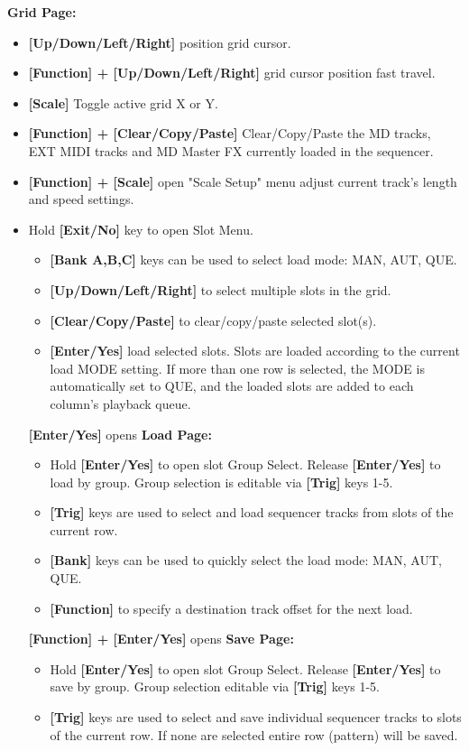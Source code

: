 \textbf{Grid Page:}
    \begin{itemize}
      \item \textbf{[Up/Down/Left/Right]} position grid cursor. 
      \item \textbf{[Function] + [Up/Down/Left/Right]} grid cursor position fast travel.
      \item \textbf{[Scale]} Toggle active grid X or Y. 
      \item \textbf{[Function] + [Clear/Copy/Paste]} Clear/Copy/Paste  the MD tracks, EXT MIDI tracks and MD Master FX currently loaded in the sequencer.
      \item \textbf{[Function] + [Scale]} open "Scale Setup" menu adjust current track's length and speed settings.
      \item Hold \textbf{[Exit/No]} key to open Slot Menu.
      \begin{itemize}
                \item \textbf{[Bank A,B,C]} keys can be used to select load mode: MAN, AUT, QUE.
                \item \textbf{[Up/Down/Left/Right]} to select multiple slots in the grid.
                \item \textbf{[Clear/Copy/Paste]} to clear/copy/paste selected slot(s).
                \item \textbf{[Enter/Yes]} load selected slots. Slots are loaded according to the current load MODE setting. If more than one row is selected, the MODE is automatically set to QUE, and the loaded slots are added to each column's playback queue.                
      \end{itemize}

\textbf{[Enter/Yes]} opens \textbf{Load Page:}
    \begin{itemize}
    \item Hold \textbf{[Enter/Yes]} to open slot Group Select. Release \textbf{[Enter/Yes]} to load by group. Group selection is editable via \textbf{[Trig]} keys 1-5.
    \item \textbf{[Trig]} keys are used to select and load sequencer tracks from slots of the current row.
    \item \textbf{[Bank]} keys can be used to quickly select the load mode: MAN, AUT, QUE.
    \item \textbf{[Function]} to specify a destination track offset for the next load.
    \end{itemize}
    
\textbf{[Function] + [Enter/Yes]} opens \textbf{Save Page:}
    \begin{itemize}
    \item Hold \textbf{[Enter/Yes]} to open slot Group Select. Release \textbf{[Enter/Yes]} to save by group.  Group selection editable via \textbf{[Trig]} keys 1-5.
    \item \textbf{[Trig]} keys are used to select and save individual sequencer tracks to slots of the current row. If none are selected entire row (pattern) will be saved.
    \end{itemize}
\end{itemize}

